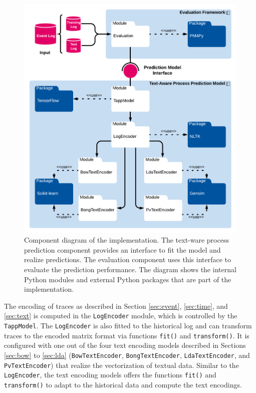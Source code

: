 \begin{figure}[htbp!]
	\centering
	\includegraphics[width=\textwidth]{figures/implementation}
	\caption[Component diagram of the implementation]{Component diagram of the implementation. The text-ware process prediction component provides an interface to fit the model and realize predictions. The evaluation component uses this interface to evaluate the prediction performance. The diagram shows the internal Python modules and external Python packages that are part of the implementation.}
	\label{fig:/implementation}
\end{figure}

The encoding of traces as described in Section \ref{sec:event}, \ref{sec:time}, and \ref{sec:text} is computed in the \texttt{LogEncoder} module, which is controlled by the \texttt{TappModel}.
The \texttt{LogEncoder} is also fitted to the historical log and can transform traces to the encoded matrix format via functions \texttt{fit()} and \texttt{transform()}.
It is configured with one out of the four text encoding models described in Sections \ref{sec:bow} to \ref{sec:lda} (\texttt{BowTextEncoder},  \texttt{BongTextEncoder}, \texttt{LdaTextEncoder}, and \texttt{PvTextEncoder}) that realize the vectorization of textual data.
Similar to the \texttt{LogEncoder}, the text encoding models offers the functions \texttt{fit()} and \texttt{transform()} to adapt to the historical data and compute the text encodings.

